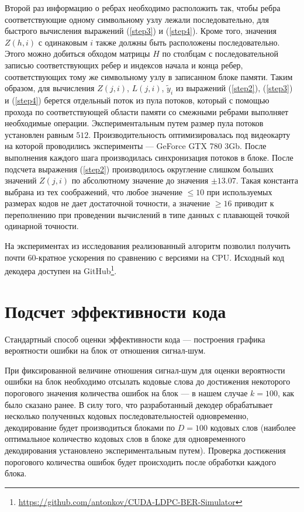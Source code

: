 Второй раз информацию о ребрах необходимо расположить так, чтобы ребра соответствующие одному символьному
узлу лежали последовательно, для быстрого вычисления выражений (\ref{step3}) и (\ref{step4}). Кроме того,
значения $Z(h,i)$ с одинаковым $i$ также должны быть расположены последовательно. Этого можно добиться
обходом матрицы $H$ по столбцам с последовательной записью соответствующих ребер и индексов начала и конца ребер, соответствующих тому же символьному узлу в записанном блоке памяти.
Таким образом, для вычисления $Z(j,i)$, $L(j,i)$, $\widetilde{y}_i$ из выражений (\ref{step2}), (\ref{step3}) 
и (\ref{step4}) берется отдельный поток из пула потоков, который с помощью прохода по соответствующей области
памяти со смежными ребрами выполняет необходимые операции. Экспериментальным путем размер пула потоков
установлен равным $512$. Производительность оптимизировалась под видеокарту на которой проводились
 эксперименты --- GeForce GTX 780 3Gb. После выполнения каждого шага производилась синхронизация потоков
 в блоке. После подсчета выражения (\ref{step2}) производилось округление слишком больших значений $Z(j,i)$ по
 абсолютному значение до значения $\pm 13.07$. Такая константа выбрана из тех соображений, что любое
 значение $\leq 10$ при используемых размерах кодов не дает достаточной точности, а значение $\geq 16$
 приводит к переполнению при проведении вычислений в типе данных с плавающей точкой одинарной точности.
 
 На экспериментах из исследования реализованный алгоритм позволил получить почти 60-кратное ускорения
 по сравнению с версиями на CPU. Исходный код декодера доступен на GitHub\footnote{\url{https://github.com/antonkov/CUDA-LDPC-BER-Simulator}}.

 

\section{Подсчет эффективности кода}

Стандартный способ оценки эффективности кода --- построения
графика вероятности ошибки на блок от отношения сигнал-шум.

При фиксированной величине отношения сигнал-шум для оценки вероятности
ошибки на блок необходимо отсылать кодовые слова до достижения некоторого порогового
значения количества ошибок на блок --- в нашем случае $k=100$, как было сказано ранее.
В силу того, что разработанный декодер обрабатывает несколько полученных
кодовых последовательностей одновременно, декодирование будет производиться
блоками по $D=100$ кодовых слов (наиболее оптимальное количество кодовых слов в блоке для 
одновременного декодирования установлено экспериментальным путем).
Проверка достижения порогового количества ошибок будет происходить после
обработки каждого блока.

